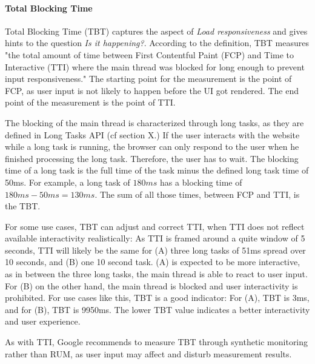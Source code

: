 

\paragraph{Total Blocking Time}


Total Blocking Time (TBT) captures the aspect of \textit{Load responsiveness} and gives hints to the question \textit{Is it happening?}.
According to the definition, TBT measures "the total amount of time between First Contentful Paint (FCP) and Time to Interactive (TTI) where the main thread was blocked for long enough to prevent input responsiveness." %
The starting point for the measurement is the point of FCP, as user input is not likely to happen before the UI got rendered.
The end point of the measurement is the point of TTI.

The blocking of the main thread is characterized through long tasks, as they are defined in Long Tasks API (cf section X.)
If the user interacts with the website while a long task is running, the browser can only respond to the user when he finished processing the long task.
Therefore, the user has to wait.
The blocking time of a long task is the full time of the task minus the defined long task time of 50ms.
For example, a long task of $180ms$ has a blocking time of $180ms - 50ms = 130ms$.
The sum of all those times, between FCP and TTI, is the TBT.



For some use cases, TBT can adjust and correct TTI, when TTI does not reflect available interactivity realistically:
As TTI is framed around a quite window of 5 seconds, TTI will likely be the same for (A) three long tasks of 51ms spread over 10 seconds, and (B) one 10 second task.
(A) is expected to be more interactive, as in between the three long tasks, the main thread is able to react to user input.
For (B) on the other hand, the main thread is blocked and user interactivity is prohibited.
For use cases like this, TBT is a good indicator:
For (A), TBT is 3ms, and for (B), TBT is 9950ms.
The lower TBT value indicates a better interactivity and user experience.

As with TTI, Google recommends to measure TBT through synthetic monitoring rather than RUM, as user input may affect and disturb measurement results.  \\




